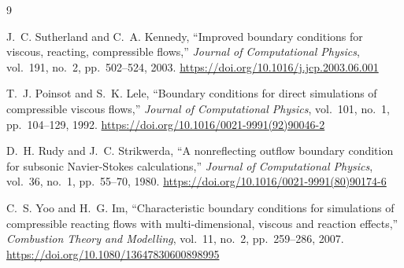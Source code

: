 \documentclass[11pt]{article}
\begin{document}
\begin{thebibliography}{9}

J.~C. Sutherland and C.~A. Kennedy,
``Improved boundary conditions for viscous, reacting, compressible flows,''
\emph{Journal of Computational Physics}, vol.~191, no.~2, pp.~502--524, 2003.
\url{https://doi.org/10.1016/j.jcp.2003.06.001}

T.~J. Poinsot and S.~K. Lele,
``Boundary conditions for direct simulations of compressible viscous flows,''
\emph{Journal of Computational Physics}, vol.~101, no.~1, pp.~104--129, 1992.
\url{https://doi.org/10.1016/0021-9991(92)90046-2}

D.~H. Rudy and J.~C. Strikwerda,
``A nonreflecting outflow boundary condition for subsonic Navier-Stokes
calculations,''
\emph{Journal of Computational Physics}, vol.~36, no.~1, pp.~55--70, 1980.
\url{https://doi.org/10.1016/0021-9991(80)90174-6}

C.~S. Yoo and H.~G. Im,
``Characteristic boundary conditions for simulations of compressible
reacting flows with multi-dimensional, viscous and reaction effects,''
\emph{Combustion Theory and Modelling}, vol.~11, no.~2, pp.~259--286, 2007.
\url{https://doi.org/10.1080/13647830600898995}

\end{thebibliography}
\end{document}
